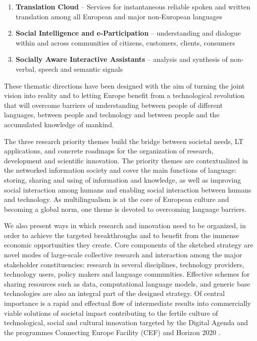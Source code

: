 \documentclass[10pt, plain]{../../metanetpaper}
\begin{document}
\begin{multicols}{2}
\begin{enumerate}
\item \textbf{Translation Cloud} -- Services for instantaneous reliable spoken and written translation among all European and major non-European languages
\item \textbf{Social Intelligence and e-Participation} -- understanding and dialogue within and across communities of citizens, customers, clients, consumers
\item \textbf{Socially Aware Interactive Assistants} -- analysis and synthesis of non-verbal, speech and semantic signals
\end{enumerate}
 
These thematic directions have been designed with the aim of turning the joint vision into reality and to letting Europe benefit from a technological revolution that will overcome barriers of understanding between people of different languages, between people and technology and between people and the accumulated knowledge of mankind.

The three research priority themes build the bridge between societal needs, LT applications, and concrete roadmaps for the organization of research, development and scientific innovation. The priority themes are contextualized in the networked information society and cover the main functions of language: storing, sharing and using of information and knowledge, as well as improving social interaction among humans and enabling social interaction between humans and technology. As multilingualism is at the core of European culture and becoming a global norm, one theme is devoted to overcoming language barriers.

We also present ways in which research and innovation need to be organized, in order to achieve the targeted breakthroughs and to benefit from the immense economic opportunities they create. Core components of the sketched strategy are novel modes of large-scale collective research and interaction among the major stakeholder constituencies: research in several disciplines, technology providers, technology users, policy makers and language communities. Effective schemes for sharing resources such as data, computational language models, and generic base technologies are also an integral part of the designed strategy. Of central importance is a rapid and effectual flow of intermediate results into commercially viable solutions of societal impact contributing to the fertile culture of technological, social and cultural innovation targeted by the Digital Agenda \cite{DA2010} and the programmes Connecting Europe Facility (CEF) \cite{CEF2011} and Horizon 2020 \cite{H2020}.
\end{multicols}
\end{document}
